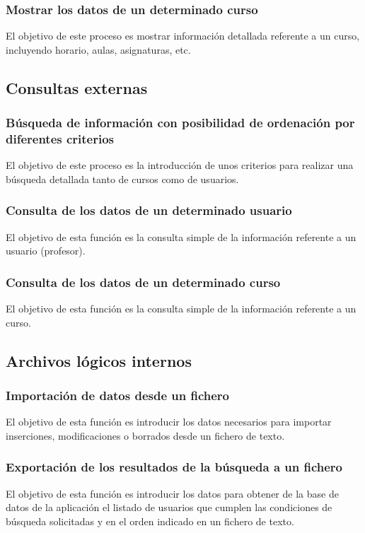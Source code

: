 \documentclass[11pt,a4paper,spanish,twoside]{book}
\begin{document}
\subsubsection{Mostrar los datos de un determinado curso}
El objetivo de este proceso es mostrar información detallada referente a un
curso, incluyendo horario, aulas, asignaturas, etc.

\subsection{Consultas externas}
\subsubsection{Búsqueda de información con posibilidad de ordenación por
  diferentes criterios}
El objetivo de este proceso es la introducción de unos criterios para realizar 
una búsqueda detallada tanto de cursos como de usuarios.

\subsubsection{Consulta de los datos de un determinado usuario}
El objetivo de esta función es la consulta simple de la información referente
a un usuario (profesor).

\subsubsection{Consulta de los datos de un determinado curso}
El objetivo de esta función es la consulta simple de la información referente
a un curso.

\subsection{Archivos lógicos internos}
\subsubsection{Importación de datos desde un fichero}
El objetivo de esta función es introducir los datos necesarios para importar 
inserciones, modificaciones o borrados desde un fichero de texto.

\subsubsection{Exportación de los resultados de la búsqueda a un fichero}
El objetivo de esta función es introducir los datos para obtener de la base
de datos de la aplicación el listado de usuarios que cumplen las condiciones de
búsqueda solicitadas y en el orden indicado en un fichero de texto.
\end{document}
